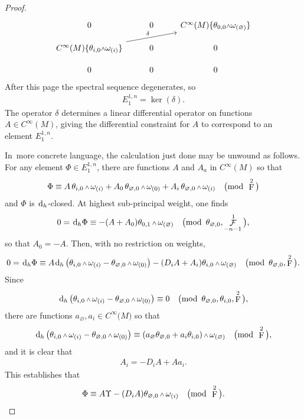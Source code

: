 \documentclass[10pt,a4paper]{amsart}
\renewcommand{\d}{{\rm d}}
\newcommand{\cinfinity}[1]{C^\infty\big(#1\big)}
\renewcommand{\mod}[1]{\quad\big(\mathrm{mod\enspace} #1\big)}
\newcommand{\w}{{\mathchoice{\,{\scriptstyle\wedge}\,}{{\scriptstyle\wedge}}
 {{\scriptscriptstyle\wedge}}{{\scriptscriptstyle\wedge}}}}
\newcommand{\thetas}[1]{\theta_{#1}}
\newcommand{\omegas}[1]{\omega_{(#1)}}
\DeclareMathOperator{\pwf}{F}
\DeclareMathOperator{\swf}{\mathcal{F}}
\renewcommand{\dh}{\ensuremath{\hspace{1pt} \d_h}}
\newcommand{\cMinfty}{C^\infty(M)}
\numberwithin{equation}{section}
\begin{document}
\begin{proof}
\[
\begin{tikzcd}
0 & 0 & \cMinfty\{\thetas{0,0}\w\omegas{\varnothing}\} \\[-2ex]
\cMinfty\{\thetas{i,0}\w\omegas{i}\} \ar[urr, "\delta"] & 0 & 0 \\[-2ex]
0 & 0 & 0
\end{tikzcd}
\]
After this page the spectral sequence degenerates, so
\begin{gather*}
E^{1,n}_1 = \ker(\delta) .
\end{gather*}
The operator $\delta$ determines a linear differential operator on functions $A \in \cMinfty$, giving the differential constraint for $A$ to correspond to an element $E^{1,n}_1$.

In~more concrete language, the calculation just done may be unwound as follows. For any element $\Phi\in E^{1,n}_1$, there are functions $A$ and $A_a$ in $\cMinfty$ so that
\begin{gather*}
\Phi \equiv A\,\thetas{i,0}\w\omegas{i} + A_0\,\thetas{\varnothing,0}\w\omegas{0} + A_i\,\thetas{\varnothing,0}\w\omegas{i} \mod{\pwf^2}
\end{gather*}
and $\Phi$ is $\dh$-closed. At highest sub-principal weight, one finds
\begin{gather*}
0 = \dh\Phi \equiv -(A + A_0)\thetas{0,1}\w\omegas{\varnothing} \mod{\thetas{\varnothing,0}, \swf^1_{-n-1}} ,
\end{gather*}
so that $A_0 = -A$. Then, with no restriction on weights,
\begin{gather*}
0 = \dh\Phi \equiv A\dh\left(\thetas{i,0}\w\omegas{i} - \thetas{\varnothing,0}\w\omegas{0}\right) - (D_iA + A_i)\thetas{i,0}\w\omegas{\varnothing} \mod{\thetas{\varnothing,0}, \pwf^2} .
\end{gather*}
Since
\begin{gather*}
\dh\left(\thetas{i,0}\w\omegas{i} - \thetas{\varnothing,0}\w\omegas{0}\right) \equiv 0 \mod{\thetas{\varnothing,0},\thetas{i,0}, \pwf^2} ,
\end{gather*}
there are functions $a_\varnothing, a_i \in \cinfinity{M}$ so that
\begin{gather*}
\dh\left(\thetas{i,0}\w\omegas{i} - \thetas{\varnothing,0}\w\omegas{0}\right) \equiv (a_\varnothing\thetas{\varnothing,0} + a_i\thetas{i,0})\w\omegas{\varnothing} \mod{\pwf^2} ,
\end{gather*}
and it is clear that
\begin{gather*}
A_i = - D_i A + Aa_i .
\end{gather*}
This establishes that
\begin{gather*}
\Phi \equiv A\Upsilon - (D_iA) \thetas{\varnothing,0}\w\omegas{i} \mod{\pwf^2} .
\end{gather*}


\end{proof}
\end{document}
